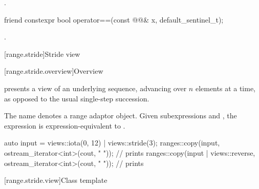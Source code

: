 \begin{itemdescr}
\pnum
\returns
{}.
\end{itemdescr}

%
\begin{itemdecl}
friend constexpr bool operator==(const @@& x, default_sentinel_t);
\end{itemdecl}

\begin{itemdescr}
\pnum
\returns
{}.
\end{itemdescr}

[range.stride]{Stride view}

[range.stride.overview]{Overview}

\pnum
{} presents a view of an underlying sequence,
advancing over $n$ elements at a time,
as opposed to the usual single-step succession.

\pnum
The name  denotes
a range adaptor object.
Given subexpressions  and ,
the expression 
is expression-equivalent to .

\pnum
\begin{example}
\begin{codeblock}
auto input = views::iota(0, 12) | views::stride(3);
ranges::copy(input, ostream_iterator<int>(cout, " "));                  // prints 
ranges::copy(input | views::reverse, ostream_iterator<int>(cout, " ")); // prints 
\end{codeblock}
\end{example}

[range.stride.view]{Class template }

